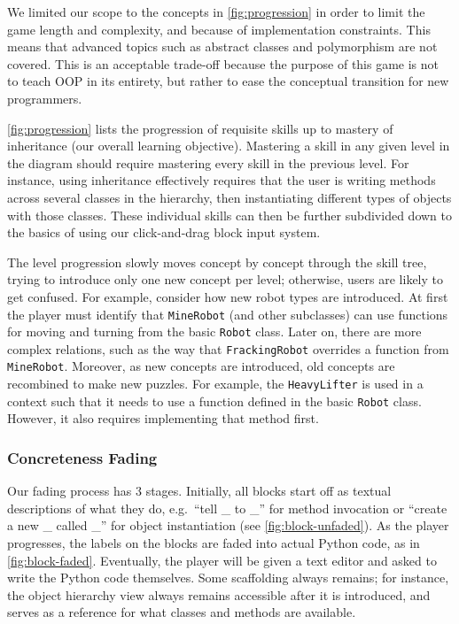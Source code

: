 \documentclass[12pt,notitlepage]{article}
\begin{document}
We limited our scope to the concepts in \autoref{fig:progression} in
order to limit the game length and complexity, and because of
implementation constraints. This means that advanced topics such as
abstract classes and polymorphism are not covered. This is an
acceptable trade-off because the purpose of this game is not to teach
OOP in its entirety, but rather to ease the conceptual transition for
new programmers.

\autoref{fig:progression} lists the progression of requisite skills up
to mastery of inheritance (our overall learning objective). Mastering
a skill in any given level in the diagram should require mastering
every skill in the previous level. For instance, using inheritance
effectively requires that the user is writing methods across several
classes in the hierarchy, then instantiating different types of objects
with those classes. These individual skills can then be further subdivided
down to the basics of using our click-and-drag block input system.

The level progression slowly moves concept by concept through the
skill tree, trying to introduce only one new concept per level;
otherwise, users are likely to get confused. For example, consider how
new robot types are introduced. At first the player must identify that
\texttt{MineRobot} (and other subclasses) can use functions for moving
and turning from the basic \texttt{Robot} class. Later on, there are
more complex relations, such as the way that \texttt{FrackingRobot}
overrides a function from \texttt{MineRobot}. Moreover, as new
concepts are introduced, old concepts are recombined to make new
puzzles. For example, the \texttt{HeavyLifter} is used in a context
such that it needs to use a function defined in the basic
\texttt{Robot} class. However, it also requires implementing that
method first.

\subsubsection{Concreteness Fading}

Our fading process has 3 stages. Initially, all blocks start off as
textual descriptions of what they do, e.g.\ ``tell \_ to \_'' for
method invocation or ``create a new \_ called \_'' for object
instantiation (see \autoref{fig:block-unfaded}). As the player
progresses, the labels on the blocks are faded into actual Python code,
as in \autoref{fig:block-faded}. Eventually, the player will be given
a text editor and asked to write the Python code themselves. Some
scaffolding always remains; for instance, the object hierarchy view always
remains accessible after it is introduced, and serves as a reference for
what classes and methods are available.
\end{document}
